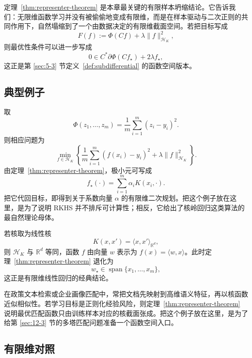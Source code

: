 \begin{remark}
定理~\ref{thm:representer-theorem} 是本章最关键的有限样本坍缩结论。它告诉我们：无限维函数学习并没有被偷偷地变成有限维，而是在样本驱动与二次正则的共同作用下，自然塌缩到了一个由数据决定的有限维截面空间。若把目标写成
\[
F(f):=\Phi(Cf)+\lambda\|f\|_{\mathcal H_K}^2,
\]
则最优性条件可以进一步写成
\[
0\in C^\ast\partial \Phi(Cf_\star)+2\lambda f_\star,
\]
这正是第 \ref{sec:5-3} 节定义~\ref{def:subdifferential} 的函数空间版本。
\end{remark}

\subsection{典型例子}

\begin{example}[核岭回归]\label{ex:kernel-ridge-regression}
取
\[
\Phi(z_1,\dots,z_m)=\frac{1}{m}\sum_{i=1}^m (z_i-y_i)^2.
\]
则相应问题为
\[
\min_{f\in \mathcal H_K}
\left\{
\frac{1}{m}\sum_{i=1}^m (f(x_i)-y_i)^2+\lambda \|f\|_{\mathcal H_K}^2
\right\}.
\]
由定理~\ref{thm:representer-theorem}，极小元可写成
\[
f_\star(\cdot)=\sum_{i=1}^m \alpha_i K(x_i,\cdot).
\]
把它代回目标，即得到关于系数向量 $\alpha$ 的有限维二次规划。把这个例子放在这里，是为了说明 RKHS 并不排斥可计算性；相反，它给出了核岭回归这类算法的最自然理论母体。
\end{example}

\begin{example}[有限维线性回归的坍缩]
若核取为线性核
\[
K(x,x')=\langle x,x'\rangle_{\mathbb R^d},
\]
则 $\mathcal H_K$ 与 $\mathbb R^d$ 等同，函数 $f$ 由向量 $w$ 表示为 $f(x)=\langle w,x\rangle$。此时定理~\ref{thm:representer-theorem} 退化为
\[
w_\star\in \operatorname{span}\{x_1,\dots,x_m\},
\]
这正是有限维线性回归的经典结论。
\end{example}

\begin{example}[文本与政策匹配中的核表示]
在政策文本检索或企业画像匹配中，常把文档先映射到高维语义特征，再以核函数近似相似性。若学习目标是正则化经验风险，则定理~\ref{thm:representer-theorem} 说明最优匹配函数只由训练样本对应的核截面张成。把这个例子放在这里，是为了给第 \ref{sec:12-3} 节的多塔匹配问题准备一个函数空间入口。
\end{example}

\subsection*{有限维对照}

